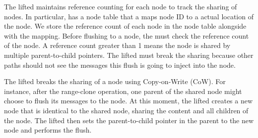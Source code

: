 The lifted \bedag maintains reference counting for each node to track the
sharing of nodes.
In particular, \fti has a node table that a maps node ID to a actual location of
the node.
We store the reference count of each node in the node table alongside
with the mapping.
Before flushing to a node, the \bedag must check the reference count of the node.
A reference count greater than 1 means the node is shared by multiple
parent-to-child pointers.
The lifted \bedag must break the sharing because other paths should not see the
messages this flush is going to inject into the node.

The lifted \bedag breaks the sharing of a node using Copy-on-Write (CoW).
For instance, after the range-clone operation, one parent of the shared node
might choose to flush its messages to the node.
At this moment, the lifted \bedag creates a new node that is identical to the
shared node, sharing the content and all children of the node.
The lifted \bedag then sets the parent-to-child pointer in the parent to the new
node and performs the flush.

